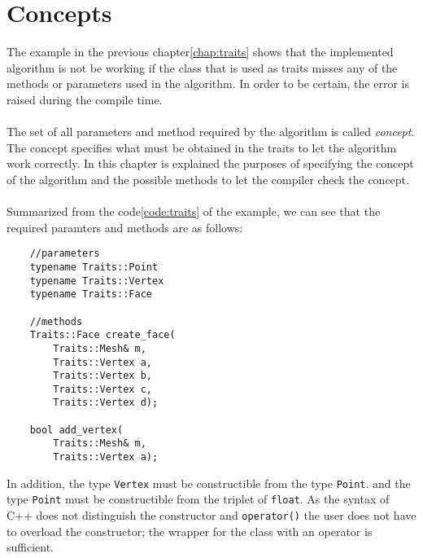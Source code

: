 \chapter{Concepts}

The example in the previous chapter\ref{chap:traits} shows that the implemented algorithm
is not be working if the class that is used as traits misses any of the methods or parameters
used in the algorithm. In order to be certain, the error is raised during the compile time.\\
\\
The set of all parameters and method required by the algorithm is called \emph{concept}.
The concept specifies what must be obtained in the traits to let the algorithm work correctly.
In this chapter is explained the purposes of specifying the concept of the algorithm and the
possible methods to let the compiler check the concept.\\
\\
Summarized from the code\ref{code:traits} of the example, we can see that the required
paramters and methods are as follows:

\begin{lstlisting}
	//parameters
	typename Traits::Point
	typename Traits::Vertex
	typename Traits::Face
	
	//methods
	Traits::Face create_face(
		Traits::Mesh& m,
		Traits::Vertex a,
		Traits::Vertex b,
		Traits::Vertex c,
		Traits::Vertex d);

	bool add_vertex(
		Traits::Mesh& m,
		Traits::Vertex a);
\end{lstlisting}
In addition, the type \texttt{Vertex} must be constructible from the type \texttt{Point}.
and the type \texttt{Point} must be constructible from the triplet of \texttt{float}.
As the syntax of C++ does not distinguish the constructor and \texttt{operator()} the
user does not have to overload the constructor; the wrapper for the class with an
operator is sufficient.